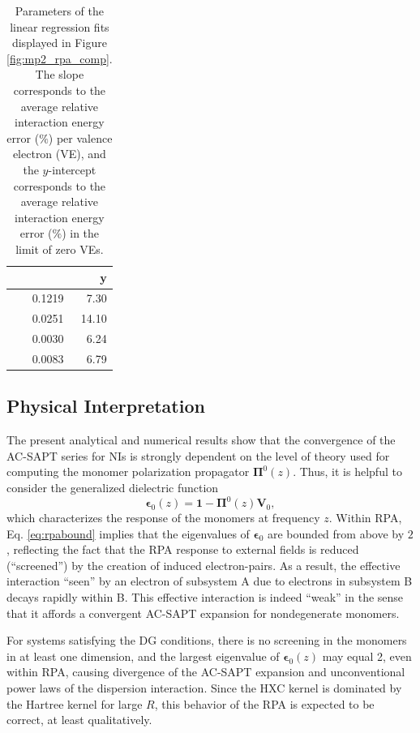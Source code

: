 \documentclass[journal=jctcce,manuscript=article]{achemso}
\begin{document}
\begin{table}[hbpt]
  \caption{Parameters of the linear regression
    fits displayed in Figure \ref{fig:mp2_rpa_comp}. The slope
    corresponds to the 
    average relative interaction energy error ($\%$) per valence electron (VE), and
    the $y$-intercept corresponds to the average relative interaction
    energy error ($\%$) in the limit of zero VEs.} 
  \begin{tabular}{lRR}
    \hline
     &  & y \\
    \hline
     & 0.1219 & 7.30 \\
     & 0.0251 & 14.10 \\
    & 0.0030 & 6.24 \\
      & 0.0083 & 6.79 \\
    \hline
  \end{tabular}
  \label{tab:slopes}
\end{table}

\subsection{Physical Interpretation}

The present analytical and numerical results show that the convergence
of the AC-SAPT series for NIs is strongly dependent on the level of theory
used for computing the monomer polarization propagator
$\boldsymbol{\Pi}^0(z)$. Thus, it is helpful to consider the generalized
dielectric function
\begin{equation}
    \boldsymbol{\epsilon}_0(z) = \mathbf{1} - \boldsymbol{\Pi}^0(z)
  \mathbf{V}_0,
\end{equation}
which characterizes the response of the monomers at frequency
$z$. Within RPA, Eq. \eqref{eq:rpabound} implies that the 
eigenvalues of $\boldsymbol{\epsilon}_{0}$ are bounded from above by
$2$, reflecting the fact that the RPA response to external fields is
reduced (``screened'') by the creation of induced electron-pairs. As a
result, the 
effective interaction ``seen'' by an electron of subsystem A due to
electrons in subsystem B decays rapidly within B. This effective
interaction is indeed ``weak'' in the sense that 
it affords a convergent AC-SAPT expansion for nondegenerate monomers.

For systems satisfying the DG conditions, there is no screening in the
monomers in at least one dimension, and the largest eigenvalue of
$\boldsymbol{\epsilon}_{0}(z)$ may equal 2, even within RPA, causing
divergence of the AC-SAPT expansion and unconventional power laws of the
dispersion interaction. Since the HXC kernel is dominated by the Hartree
kernel for large $R$, this behavior of the RPA is expected to be
correct, at least qualitatively.
\end{document}
